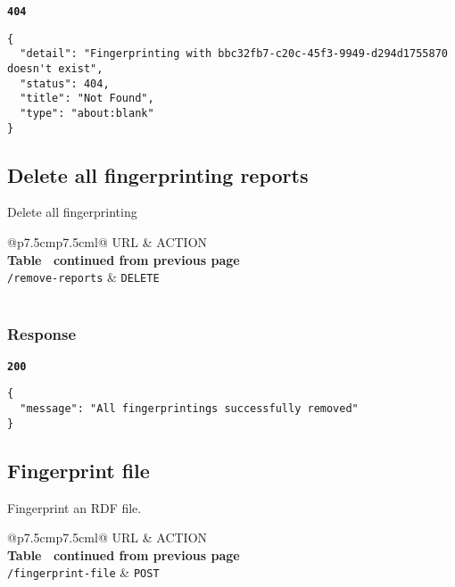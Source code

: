 \textbf{\texttt{404}}
\begin{lstlisting}
{
  "detail": "Fingerprinting with bbc32fb7-c20c-45f3-9949-d294d1755870 doesn't exist",
  "status": 404,
  "title": "Not Found",
  "type": "about:blank"
}
\end{lstlisting}

\subsection{Delete all fingerprinting reports}
Delete all fingerprinting

\begin{longtable}[c]{@{}p{7.5cm}p{7.5cm}l@{}}
  \toprule
  URL                      & ACTION                           \\* \midrule
  \endfirsthead
  \multicolumn{3}{c}%
  {{\bfseries Table \thetable\ continued from previous page}} \\
  \endhead
  \bottomrule
  \endfoot
  \endlastfoot
  \texttt{/remove-reports} & \texttt{DELETE}                  \\* \bottomrule
  \label{tab:rdf-fingerprinter-delete-fingerprinting}                \\
\end{longtable}

\subsubsection{Response}
\textbf{\texttt{200}}
\begin{lstlisting}
{
  "message": "All fingerprintings successfully removed"
}
\end{lstlisting}

\subsection{Fingerprint file}
Fingerprint an RDF file.

\begin{longtable}[c]{@{}p{7.5cm}p{7.5cm}l@{}}
  \toprule
  URL                            & ACTION                     \\* \midrule
  \endfirsthead
  \multicolumn{3}{c}%
  {{\bfseries Table \thetable\ continued from previous page}} \\
  \endhead
  \bottomrule
  \endfoot
  \endlastfoot
  \texttt{/fingerprint-file} & \texttt{POST}              \\* \bottomrule
  \label{tab:rdf-fingerprinter-file}                              \\
\end{longtable}

